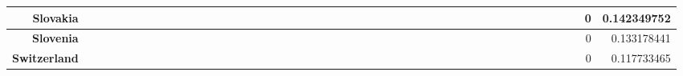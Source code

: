 \documentclass[a4paper,11pt]{report}
\begin{document}
\begin{appendices}
\begin{landscape}
\begin{longtable}{r|r|r|r|r|r|r|r|r|r|r|r|r|r|r|r|r|r|r|r|r|r|r|r|r|r|r|r|r|r|r|r|r|r|r|r|r|r|r|r|r|r|r|r|r|r|r|}
\multicolumn{1}{|r|}{\textbf{Slovakia}}              &                  &                  &                  &                     &                  &                  &                                &                   &                  &                 &                         &                  &                  &                           &                  &                 &                  &                 &                  &                  &                  &                 &                 &                    &                &                  &                     &                 &                 &                   &                  &                 &                 &                   &                   &                &                 &                      &                          &                 &                  &                         &                 &                & 0                        & 0.142349752        \\ \hline
\multicolumn{1}{|r|}{\textbf{Slovenia}}              &                  &                  &                  &                     &                  &                  &                                &                   &                  &                 &                         &                  &                  &                           &                  &                 &                  &                 &                  &                  &                  &                 &                 &                    &                &                  &                     &                 &                 &                   &                  &                 &                 &                   &                   &                &                 &                      &                          &                 &                  &                         &                 &                & 0                        & 0.133178441        \\ \hline
\multicolumn{1}{|r|}{\textbf{Switzerland}}           &                  &                  &                  &                     &                  &                  &                                &                   &                  &                 &                         &                  &                  &                           &                  &                 &                  &                 &                  &                  &                  &                 &                 &                    &                &                  &                     &                 &                 &                   &                  &                 &                 &                   &                   &                &                 &                      &                          &                 &                  &                         &                 &                & 0                        & 0.117733465        \\ \hline

\end{longtable}
\end{landscape}
\end{appendices}
\end{document}
